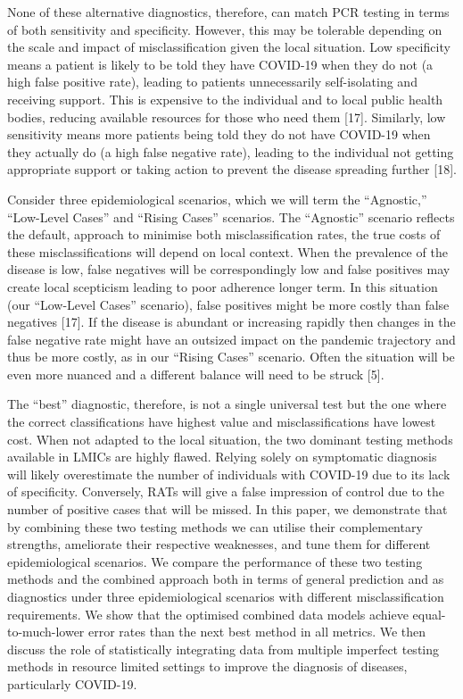 \documentclass[]{elsarticle} %
\begin{document}
None of these alternative diagnostics, therefore, can match PCR testing in terms of both sensitivity and specificity.
However, this may be tolerable depending on the scale and impact of misclassification given the local situation.
Low specificity means a patient is likely to be told they have COVID-19 when they do not (a high false positive rate), leading to patients unnecessarily self-isolating and receiving support.
This is expensive to the individual and to local public health bodies, reducing available resources for those who need them {[}17{]}.
Similarly, low sensitivity means more patients being told they do not have COVID-19 when they actually do (a high false negative rate), leading to the individual not getting appropriate support or taking action to prevent the disease spreading further {[}18{]}.

Consider three epidemiological scenarios, which we will term the ``Agnostic,'' ``Low-Level Cases'' and ``Rising Cases'' scenarios.
The ``Agnostic'' scenario reflects the default, approach to minimise both misclassification rates, the true costs of these misclassifications will depend on local context.
When the prevalence of the disease is low, false negatives will be correspondingly low and false positives may create local scepticism leading to poor adherence longer term.
In this situation (our ``Low-Level Cases'' scenario), false positives might be more costly than false negatives {[}17{]}.
If the disease is abundant or increasing rapidly then changes in the false negative rate might have an outsized impact on the pandemic trajectory and thus be more costly, as in our ``Rising Cases'' scenario.
Often the situation will be even more nuanced and a different balance will need to be struck {[}5{]}.

The ``best'' diagnostic, therefore, is not a single universal test but the one where the correct classifications have highest value and misclassifications have lowest cost.
When not adapted to the local situation, the two dominant testing methods available in LMICs are highly flawed.
Relying solely on symptomatic diagnosis will likely overestimate the number of individuals with COVID-19 due to its lack of specificity.
Conversely, RATs will give a false impression of control due to the number of positive cases that will be missed.
In this paper, we demonstrate that by combining these two testing methods we can utilise their complementary strengths, ameliorate their respective weaknesses, and tune them for different epidemiological scenarios.
We compare the performance of these two testing methods and the combined approach both in terms of general prediction and as diagnostics under three epidemiological scenarios with different misclassification requirements.
We show that the optimised combined data models achieve equal-to-much-lower error rates than the next best method in all metrics.
We then discuss the role of statistically integrating data from multiple imperfect testing methods in resource limited settings to improve the diagnosis of diseases, particularly COVID-19.
\end{document}
